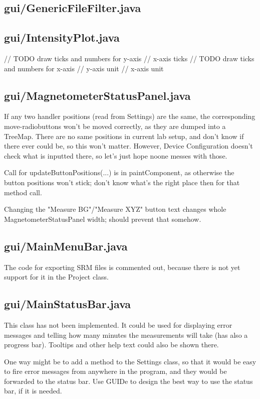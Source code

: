 \subsection{gui/GenericFileFilter.java}

\subsection{gui/IntensityPlot.java}
        // TODO draw ticks and numbers for y-axis
        // x-axis ticks
        // TODO draw ticks and numbers for x-axis
        // y-axis unit
        // x-axis unit

\subsection{gui/MagnetometerStatusPanel.java}

If any two handler positions (read from Settings) are the same, the corresponding move-radiobuttons won't be moved correctly, as they are dumped into a TreeMap. There are no same positions in current lab setup, and don't know if there ever could be, so this won't matter. However, Device Configuration doesn't check what is inputted there, so let's just hope noone messes with those.

Call for updateButtonPositions(...) is in paintComponent, as otherwise the button positions won't stick; don't know what's the right place then for that method call.

Changing the "Measure BG"/"Measure XYZ" button text changes whole MagnetometerStatusPanel width; should prevent that somehow.


\subsection{gui/MainMenuBar.java}

The code for exporting SRM files is commented out, because there is not yet support for it in the Project class.


\subsection{gui/MainStatusBar.java}

This class has not been implemented. It could be used for displaying error messages and telling how many minutes the measurements will take (has also a progress bar). Tooltips and other help text could also be shown there.

One way might be to add a method to the Settings class, so that it would be easy to fire error messages from anywhere in the program, and they would be forwarded to the status bar. Use GUIDe to design the best way to use the status bar, if it is needed.


